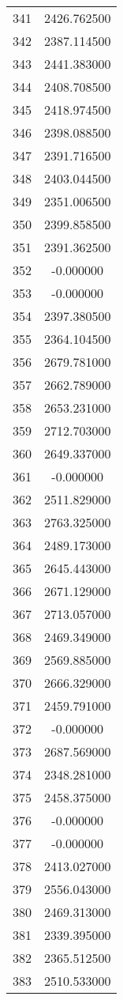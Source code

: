 \documentclass[12pt]{article}
\begin{document}
\begin{longtable}{@{}cc@{}}
341 & 2426.762500 \\
342 & 2387.114500 \\
343 & 2441.383000 \\
344 & 2408.708500 \\
345 & 2418.974500 \\
346 & 2398.088500 \\
347 & 2391.716500 \\
348 & 2403.044500 \\
349 & 2351.006500 \\
350 & 2399.858500 \\
351 & 2391.362500 \\
352 & -0.000000 \\
353 & -0.000000 \\
354 & 2397.380500 \\
355 & 2364.104500 \\
356 & 2679.781000 \\
357 & 2662.789000 \\
358 & 2653.231000 \\
359 & 2712.703000 \\
360 & 2649.337000 \\
361 & -0.000000 \\
362 & 2511.829000 \\
363 & 2763.325000 \\
364 & 2489.173000 \\
365 & 2645.443000 \\
366 & 2671.129000 \\
367 & 2713.057000 \\
368 & 2469.349000 \\
369 & 2569.885000 \\
370 & 2666.329000 \\
371 & 2459.791000 \\
372 & -0.000000 \\
373 & 2687.569000 \\
374 & 2348.281000 \\
375 & 2458.375000 \\
376 & -0.000000 \\
377 & -0.000000 \\
378 & 2413.027000 \\
379 & 2556.043000 \\
380 & 2469.313000 \\
381 & 2339.395000 \\
382 & 2365.512500 \\
383 & 2510.533000 \\

\end{longtable}
\end{document}
